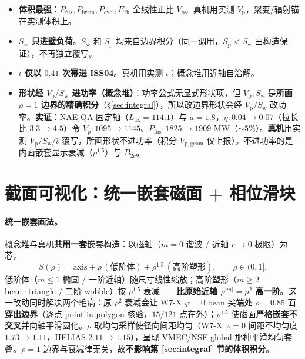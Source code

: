 \documentclass[UTF8,11pt]{ctexart}
\newcommand{\Vp}{V_\mathrm{p}}
\newcommand{\Sw}{S_\mathrm{w}}
\newcommand{\Sp}{S_\mathrm{p}}
\newcommand{\Lax}{L_\mathrm{ax}}
\newcommand{\Pfus}{P_\mathrm{fus}}
\newcommand{\Pbrem}{P_\mathrm{brem}}
\newcommand{\Pcycl}{P_\mathrm{cycl}}
\newcommand{\Eth}{E_\mathrm{th}}
\newcommand{\iotabar}{\bar{\iota}}
\newcommand{\etabar}{\bar\eta}
\begin{document}
\begin{itemize}[leftmargin=1.4em]
\item \textbf{体积最强}：$\Pfus,\Pbrem,\Pcycl,\Eth$ 全线性正比 $\Vp$。真机用实测 $\Vp$，聚变/辐射锚在实测体积上。
\item \textbf{$\Sw$ 只进壁负荷}。$\Sw$ 和 $\Sp$ 均来自边界积分（同一调用，$\Sp<\Sw$ 由构造保证），不再独立覆写。
\item \textbf{$\iotabar$ 仅以 $0.41$ 次幂进 ISS04}。真机用实测 $\iotabar$；概念堆用近轴自洽解。
\item \textbf{形状经 $\Vp/\Sw$ 进功率（概念堆）}：功率公式无显式形状项，但 $\Vp,\Sw$ 是\textbf{所画 $\rho{=}1$ 边界的精确积分}（\S\ref{sec:integral}），所以改边界形状会经 $\Vp/\Sw$ 改功率。\textbf{实证}：NAE-QA 固定轴（$\Lax{=}114.1$）与 $a{=}1.8$，$\etabar{:}0.04\!\to\!0.07$（拉长比 $3.3\!\to\!4.5$）令 $\Vp{:}1095\!\to\!1145$、$\Pfus{:}1825\!\to\!1909$ MW（$\sim5\%$）。\textbf{真机}用实测 $\Vp/\Sw/\iotabar$ 覆写，所画形状不进功率（积分 $V_\mathrm{p,geom}$ 仅上报）。不进功率的是内面嵌套显示衰减（$\rho^{1.5}$）与 $B_{2c}$。
\end{itemize}

\section{截面可视化：统一嵌套磁面 + 相位滑块}\label{sec:view}

\paragraph{统一嵌套画法。}
概念堆与真机\textbf{共用一套}嵌套构造：以磁轴（$m{=}0$ 谐波 / 近轴 $r\!\to\!0$ 极限）为芯，
\begin{equation}
S(\rho)=\text{axis}+\rho\,(\text{低阶体})+\rho^{1.5}\,(\text{高阶塑形}),\qquad \rho\in(0,1].
\end{equation}
低阶体（$m\!\le\!1$ 椭圆 / 一阶近轴）随尺寸线性缩放；高阶塑形（$m\!\ge\!2$ bean·triangle / 二阶 wobble）按 $\rho^{1.5}$ 衰减——\textbf{比原始近轴 $\rho^{|m|}{=}\rho^2$ 高一阶}。这一改动同时解决两个毛病：原 $\rho^2$ 衰减会让 W7-X $\varphi{=}0$ bean 尖端处 $\rho{=}0.85$ 面\textbf{穿出边界}（逐点 point-in-polygon 核验，$15/121$ 点在外）；$\rho^{1.5}$ 使磁面\textbf{严格嵌套不交叉}并向轴平滑圆化。$\rho$ 取均匀采样使径向间距均匀（W7-X $\varphi{=}0$ 间距不均匀度 $1.73\!\to\!1.11$，HELIAS $2.11\!\to\!1.15$），呈现 VMEC/NSE-global 那种平滑均匀套叠。$\rho=1$ 边界与衰减律无关，故\textbf{不影响第 \ref{sec:integral} 节的体积积分}。
\end{document}
